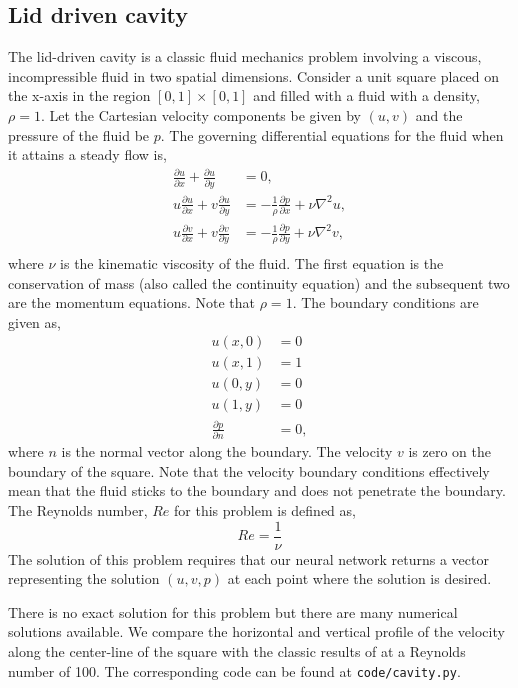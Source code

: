 \documentclass[12pt]{article}
\newcommand{\code}[1]{\lstinline{#1}}
\begin{document}
\subsection{Lid driven cavity}
The lid-driven cavity is a classic fluid mechanics problem involving a viscous, incompressible fluid in two spatial dimensions.  Consider a unit square placed on the x-axis in the region $[0, 1] \times [0, 1]$ and filled with a fluid with a density, $\rho=1$.   Let the Cartesian velocity components be given by $(u, v)$ and the pressure of the fluid be $p$.  The governing differential equations for the fluid when it attains a steady flow is,
\begin{displaymath}
\begin{split}
\frac{\partial u}{\partial x} + \frac{\partial u}{\partial y} &= 0, \\
u \frac{\partial u}{\partial x} + v \frac{\partial u}{\partial y} &= -\frac{1}{\rho} \frac{\partial p}{\partial x} + \nu \nabla^2 u,\\
u \frac{\partial v}{\partial x} + v \frac{\partial v}{\partial y} &= -\frac{1}{\rho} \frac{\partial p}{\partial y} + \nu \nabla^2 v,\\
\end{split}
\end{displaymath}
where $\nu$ is the kinematic viscosity of the fluid.  The first equation is the conservation of mass (also called the continuity equation) and the subsequent two are the momentum equations.  Note that $\rho=1$.
The boundary conditions are given as,
\begin{displaymath}
\begin{split}
    u(x, 0) &= 0\\
    u(x, 1) &= 1\\
    u(0, y) &= 0 \\
    u(1, y) &= 0 \\
    \frac{\partial p}{\partial n} &= 0,
\end{split}
\end{displaymath}
where $n$ is the normal vector along the boundary. The velocity $v$ is zero on the boundary of the square.  Note that the velocity boundary conditions effectively mean that the fluid sticks to the boundary and does not penetrate the boundary. The Reynolds number, $Re$ for this problem is defined as, 
\begin{displaymath}
Re = \frac{1}{\nu}
\end{displaymath}
The solution of this problem requires that our neural network returns a vector representing the solution $(u, v, p)$ at each point where the solution is desired.

There is no exact solution for this problem but there are many numerical solutions available.  We compare the horizontal and vertical profile of the velocity along the center-line of the square with the classic results of \cite{ldc:ghia} at a Reynolds number of 100.  The corresponding code can be found at \code{code/cavity.py}.
\end{document}

